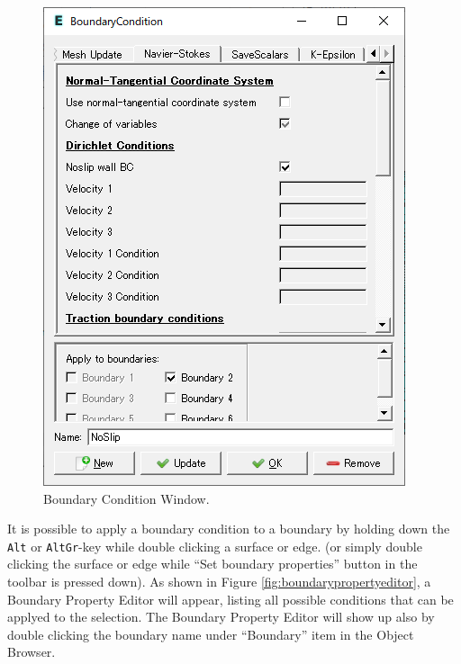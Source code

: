 \begin{figure}[htb]
\begin{center}
 \includegraphics[scale=0.5]{images/boundarycondition.png}
\caption{Boundary Condition Window.}
\label{fig:boundarycondition}
\end{center}
\end{figure}

It is possible to apply a boundary condition to a boundary by holding down 
the \texttt{Alt} or \texttt{AltGr}-key while double clicking a surface or edge. (or simply double clicking the surface or edge while ``Set boundary properties'' button in the toolbar is pressed down).
As shown in Figure \ref{fig:boundarypropertyeditor}, a Boundary Property Editor will appear, listing all possible conditions that can be applyed to the selection. The Boundary Property Editor will show up also by double clicking the boundary name under ``Boundary'' item in the Object Browser. 

